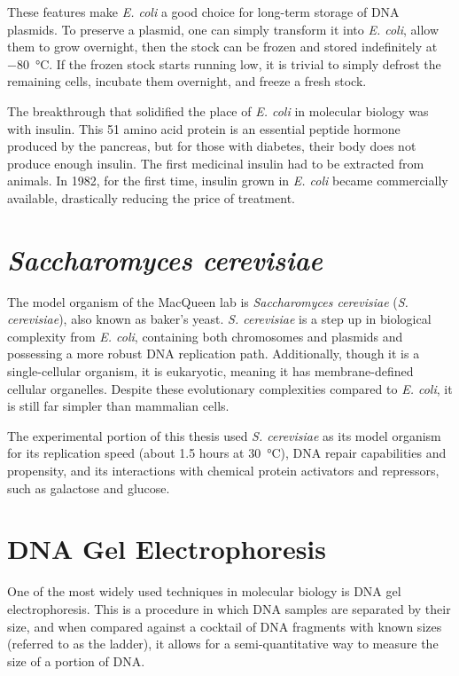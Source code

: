 These features make \textit{E. coli} a good choice for long-term storage of DNA plasmids. To preserve a plasmid, one can simply transform it into \textit{E. coli}, allow them to grow overnight, then the stock can be frozen and stored indefinitely at \qty{-80}{\degreeCelsius}. If the frozen stock starts running low, it is trivial to simply defrost the remaining cells, incubate them overnight, and freeze a fresh stock.

The breakthrough that solidified the place of \textit{E. coli} in molecular biology was with insulin. This \num{51} amino acid protein is an essential peptide hormone produced by the pancreas, but for those with diabetes, their body does not produce enough insulin. The first medicinal insulin had to be extracted from animals. In 1982, for the first time, insulin grown in \textit{E. coli} became commercially available, drastically reducing the price of treatment.

\section{\textit{Saccharomyces cerevisiae}}

The model organism of the MacQueen lab is \textit{Saccharomyces cerevisiae} (\textit{S. cerevisiae}), also known as baker's yeast. \textit{S. cerevisiae} is a step up in biological complexity from \textit{E. coli}, containing both chromosomes and plasmids and possessing a more robust DNA replication path. Additionally, though it is a single-cellular organism, it is eukaryotic, meaning it has membrane-defined cellular organelles. Despite these evolutionary complexities compared to \textit{E. coli}, it is still far simpler than mammalian cells.

The experimental portion of this thesis used \textit{S. cerevisiae} as its model organism for its replication speed (about \num{1.5} hours at \qty{30}{\degreeCelsius}), DNA repair capabilities and propensity, and its interactions with chemical protein activators and repressors, such as galactose and glucose. 

\section{DNA Gel Electrophoresis}

One of the most widely used techniques in molecular biology is DNA gel electrophoresis. This is a procedure in which DNA samples are separated by their size, and when compared against a cocktail of DNA fragments with known sizes (referred to as the ladder), it allows for a semi-quantitative way to measure the size of a portion of DNA.


